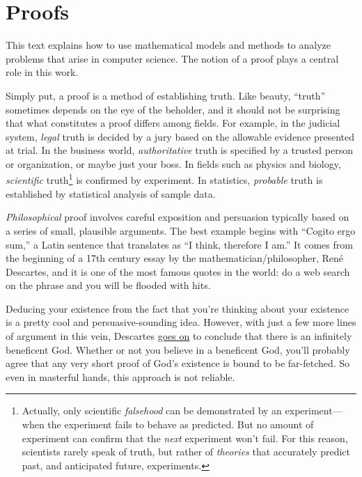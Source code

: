 \part{Proofs}
\label{part:proofs}

\partintro

This text explains how to use mathematical models and methods to
analyze problems that arise in computer science.  The notion of a
proof plays a central role in this work.

Simply put, a proof is a method of establishing truth.  Like beauty,
``truth'' sometimes depends on the eye of the beholder, and
it should not be surprising that what constitutes a proof differs
among fields.  For example, in the judicial system, \emph{legal} truth
is decided by a jury based on the allowable evidence presented at
trial.  In the business world, \emph{authoritative} truth is specified
by a trusted person or organization, or maybe just your boss.  In
fields such as physics and biology, \emph{scientific}
truth\footnote{Actually, only scientific
\emph{falsehood} can be demonstrated by an experiment---when
the experiment fails to behave as predicted.  But no amount of
experiment can confirm that the \emph{next} experiment won't fail.
For this reason, scientists rarely speak of truth, but rather
of \emph{theories} that accurately predict past, and anticipated
future, experiments.} is confirmed by experiment.  In
statistics, \emph{probable} truth is established by statistical
analysis of sample data.

\emph{Philosophical} proof involves careful exposition and
persuasion typically based on a series of small, plausible arguments.
The best example begins with ``Cogito ergo sum,'' a Latin sentence
that translates as ``I think, therefore I am.''  It comes from the
beginning of a 17th century essay by the mathematician/philosopher,
Ren\'e Descartes, and it is one of the most famous quotes in the
world: do a web search on the phrase and you will be flooded with
hits.

Deducing your existence from the fact that you're thinking about your
existence is a pretty cool and persuasive-sounding idea.
However, with just a few more lines of argument in this vein, Descartes
\href{http://www.btinternet.com/~glynhughes/squashed/descartes.htm}{goes
  on} to conclude that there is an infinitely beneficent God.  Whether
or not you believe in a beneficent God, you'll probably agree that any
very short proof of God's existence is bound to be far-fetched.  So even
in masterful hands, this approach is not reliable.

